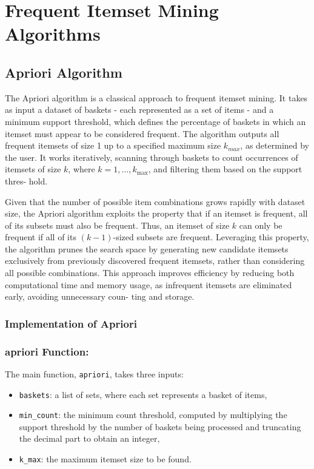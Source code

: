 \documentclass{Class/julia}
\begin{document}
\section{Frequent Itemset Mining Algorithms}\label{sec:2}

\subsection{Apriori Algorithm}

The Apriori algorithm is a classical approach to frequent itemset mining. It takes as input a dataset of baskets - each represented as a set of items - and a minimum support threshold, which defines the percentage of baskets in which an itemset must appear to be considered frequent. The algorithm outputs all frequent itemsets of size 1 up to a specified maximum size \( k_{max} \), as determined by the user. It works iteratively, scanning through baskets to count occurrences of itemsets of size \( k \), where \( k = 1, \dots, k_{\max} \), and filtering them based on the support thres- hold.

Given that the number of possible item combinations grows rapidly with dataset size, the Apriori algorithm exploits the property that if an itemset is frequent, all of its subsets must also be frequent. Thus, an itemset of size \( k \) can only be frequent if all of its \( (k-1) \)-sized subsets are frequent. Leveraging this property, the algorithm prunes the search space by generating new candidate itemsets exclusively from previously discovered frequent itemsets, rather than considering all possible combinations. This approach improves efficiency by reducing both computational time and memory usage, as infrequent itemsets are eliminated early, avoiding unnecessary coun- ting and storage.


\subsubsection{Implementation of Apriori}

\subsubsection*{apriori Function:}

The main function, \texttt{apriori}, takes three inputs:

\begin{itemize}
\item \texttt{baskets}: a list of sets, where each set represents a basket of items,
\item \texttt{min\_count}: the minimum count threshold, computed by multiplying the support threshold by the number of baskets being processed and truncating the decimal part to obtain an integer,
\item \texttt{k\_max}: the maximum itemset size to be found.
\end{itemize}
\end{document}
